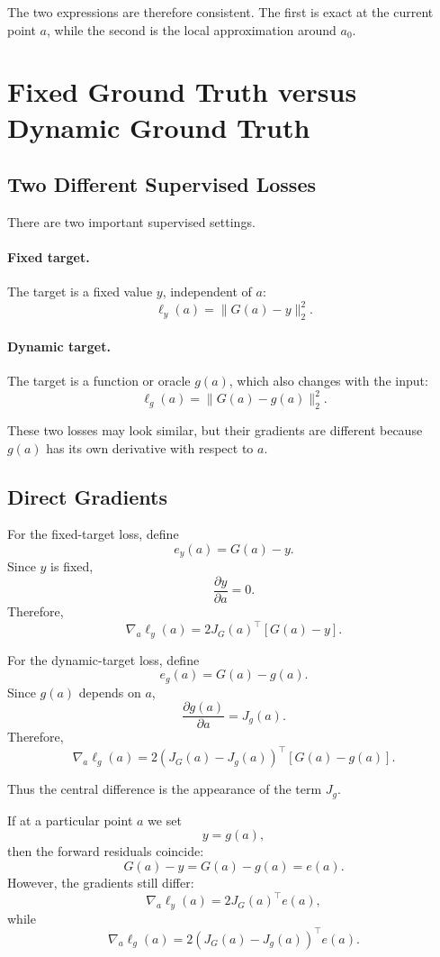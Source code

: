 \documentclass{article}
\begin{document}
The two expressions are therefore consistent. The first is exact at the current point \(a\), while the second is the local approximation around \(a_0\).

\section{Fixed Ground Truth versus Dynamic Ground Truth}

\subsection{Two Different Supervised Losses}

There are two important supervised settings.

\paragraph{Fixed target.}
The target is a fixed value \(y\), independent of \(a\):
\[
    \ell_y(a)
    =
    \|G(a)-y\|_2^2.
\]

\paragraph{Dynamic target.}
The target is a function or oracle \(g(a)\), which also changes with the input:
\[
    \ell_g(a)
    =
    \|G(a)-g(a)\|_2^2.
\]

These two losses may look similar, but their gradients are different because \(g(a)\) has its own derivative with respect to \(a\).

\subsection{Direct Gradients}

For the fixed-target loss, define
\[
    e_y(a)=G(a)-y.
\]
Since \(y\) is fixed,
\[
    \frac{\partial y}{\partial a}=0.
\]
Therefore,
\[
    \boxed{
    \nabla_a \ell_y(a)
    =
    2J_G(a)^\top [G(a)-y]
    }.
\]

For the dynamic-target loss, define
\[
    e_g(a)=G(a)-g(a).
\]
Since \(g(a)\) depends on \(a\),
\[
    \frac{\partial g(a)}{\partial a}=J_g(a).
\]
Therefore,
\[
    \boxed{
    \nabla_a \ell_g(a)
    =
    2\left(J_G(a)-J_g(a)\right)^\top [G(a)-g(a)]
    }.
\]

Thus the central difference is the appearance of the term \(J_g\).

If at a particular point \(a\) we set
\[
    y=g(a),
\]
then the forward residuals coincide:
\[
    G(a)-y
    =
    G(a)-g(a)
    =
    e(a).
\]
However, the gradients still differ:
\[
    \nabla_a \ell_y(a)
    =
    2J_G(a)^\top e(a),
\]
while
\[
    \nabla_a \ell_g(a)
    =
    2\left(J_G(a)-J_g(a)\right)^\top e(a).
\]
\end{document}
